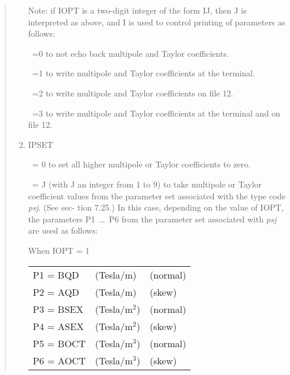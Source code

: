 \begin{quotation}
\begin{enumerate}
\vspace{5mm}
         Note: if IOPT is a two-digit integer of the form IJ, then J is interpreted as
         above, and I is used to control printing of parameters as follows:
\vspace{2mm}

         \ =0 to not echo back multipole and Taylor coefficients.

         \ =1 to write multipole and Taylor coefficients at the terminal.

         \ =2 to write multipole and Taylor coefficients on file 12.

         \ =3 to write multipole and Taylor coefficients at the
		 terminal and on file \hspace*{1.5em}12.

\item  IPSET

         \ = 0 to set all higher multipole or Taylor coefficients to zero.

         \ = J (with J an integer from 1 to 9) to take multipole or
                Taylor coefficient \hspace*{1.5em}values from the parameter set associated
              with the type code {\em psj}.  (See sec-
\hspace*{1.5em}tion 7.25.)  In this
                case, depending on the value of IOPT, the parameters
             \hspace*{1.5em}P1~\ldots~P6 from the parameter set associated with {\em psj }
                are used as follows:

\begin{center}
                When IOPT = 1

\vspace{2mm}
\begin{tabular}{lll}
                     P1 = BQD  & (Tesla/m) & (normal)\\
                     P2 = AQD  & (Tesla/m) & (skew)\\
                     P3 = BSEX & (Tesla/$\mbox{m}^2$) & (normal)\\
                     P4 = ASEX & (Tesla/$\mbox{m}^2$) & (skew)\\
                     P5 = BOCT & (Tesla/$\mbox{m}^3$) & (normal)\\
                     P6 = AOCT & (Tesla/$\mbox{m}^3$) & (skew)\\
\end{tabular}
\vspace{5mm}


\end{center}
\end{enumerate}
\end{quotation}
